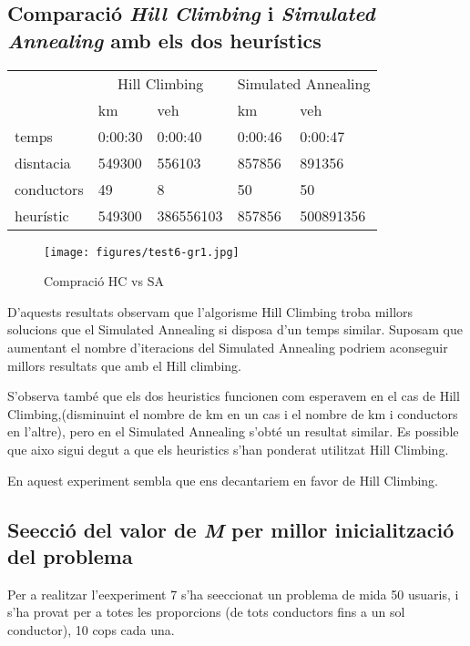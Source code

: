 \subsection{Comparació \emph{Hill Climbing} i \emph{Simulated Annealing} amb els dos heurístics}

\begin{center}
\begin{tabular}{l|llll}
 & \multicolumn{2}{c}{Hill Climbing} & \multicolumn{2}{c}{Simulated Annealing}\\
           & km       & veh       & km        & veh\\
\hline
temps      & 0:00:30  &  0:00:40  &  0:00:46  &  0:00:47\\
disntacia  & 549300   & 556103    &  857856   & 891356\\
conductors & 49       & 8         & 50        & 50\\
heurístic  & 549300   & 386556103 & 857856    & 500891356
\end{tabular}
\end{center}

\begin{figure}[H]
\begin{center}
 \texttt{[image: figures/test6-gr1.jpg]}
 \label{test6-gr1}
\caption{Compració HC vs SA}
\end{center}
\end{figure}

D'aquests resultats observam que l'algorisme Hill Climbing troba millors solucions que el Simulated Annealing si disposa d'un temps similar.
Suposam que aumentant el nombre d'iteracions del Simulated Annealing podriem aconseguir millors resultats que amb el Hill climbing.


S'observa també que els dos heuristics funcionen com esperavem en el cas de Hill Climbing,(disminuint el nombre de km en un cas
i el nombre de km i conductors en l'altre), pero en el Simulated Annealing s'obté un resultat similar.
Es possible que aixo sigui degut a que els heuristics s'han ponderat utilitzat Hill Climbing.

En aquest experiment sembla que ens decantariem en favor de Hill Climbing.






\subsection{Se\lgem ecció del valor de \emph{M} per millor inicialització del problema}
Per a realitzar l'eexperiment 7 s'ha se\lgem eccionat un problema de mida 50 usuaris, i s'ha provat per a totes les proporcions
(de tots conductors fins a un sol conductor), 10 cops cada una.

